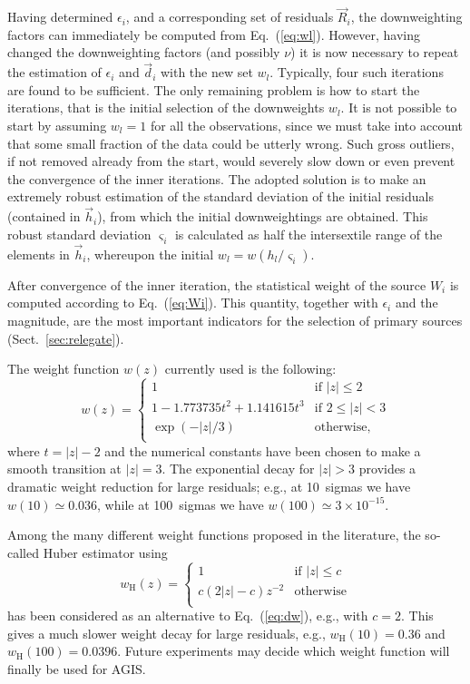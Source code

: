 \documentclass[structabstract]{aa}
\begin{document}
Having determined $\epsilon_i$, and a
corresponding set of residuals $\vec{R}_i$, the downweighting factors
can immediately be computed from Eq.~(\ref{eq:wl}). However, having
changed the downweighting factors (and possibly $\nu$) it is now
necessary to repeat the estimation of $\epsilon_i$ and $\vec{d}_i$
with the new set $w_l$. Typically, four such iterations are found to
be sufficient. The only remaining problem is how to start the iterations,
that is the initial selection of the downweights $w_l$. It is not possible to
start by assuming $w_l=1$ for all the observations, since we must take
into account that some small fraction of the data could be utterly wrong.
Such gross outliers, if not removed already from the start, would severely
slow down or even prevent the convergence of the inner iterations. The
adopted solution is to make an extremely robust estimation of the
standard deviation of the initial residuals (contained in $\vec{h}_i$),
from which the initial downweightings are obtained. This robust standard
deviation $\varsigma_i$ is calculated as half the intersextile range of
the elements in $\vec{h}_i$, whereupon the initial $w_l=w(h_l/\varsigma_i)$.

After convergence of the inner iteration, the statistical weight of the 
source $W_i$ is computed according to Eq.~(\ref{eq:Wi}). This quantity,
together with $\epsilon_i$ and the magnitude, are the most important 
indicators for the selection of primary sources (Sect.~\ref{sec:relegate}).

The weight function $w(z)$ currently used is the following:
\begin{equation}\label{eq:dw}
  w(z) =
  \begin{cases}
     1 & \text{if $|z|\le 2$} \\
     1 - 1.773735t^2 + 1.141615t^3 & \text{if $2\leq |z|<3$} \\
     \exp(-|z|/3) & \text{otherwise,} \\
  \end{cases}
\end{equation}
where $t=|z|-2$ and the numerical constants have been chosen to make a smooth
transition at $|z|=3$. The exponential decay for $|z|>3$ provides a dramatic
weight reduction for large residuals; e.g., at 10~sigmas we have
$w(10)\simeq 0.036$, while at 100~sigmas we have $w(100)\simeq 3\times 10^{-15}$.

Among the many different weight functions proposed in the literature, the
so-called Huber estimator \citep{huber:1981} using
\begin{equation}\label{eq:dwH}
  w_\text{H}(z) =
  \begin{cases}
     1 & \text{if $|z|\le c$} \\
     c(2|z|-c)z^{-2} & \text{otherwise} \\
  \end{cases}
\end{equation}
has been considered as an alternative to Eq.~(\ref{eq:dw}), e.g., with $c=2$.
This gives a much slower weight decay for large residuals, e.g.,
$w_\text{H}(10)=0.36$ and $w_\text{H}(100)=0.0396$. Future experiments
may decide which weight function will finally be used for AGIS.
\end{document}
